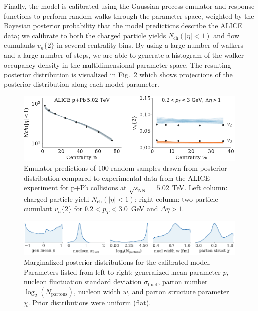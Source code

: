 \documentclass[3p,times,procedia]{elsarticle}
\begin{document}
Finally, the model is calibrated using the Gaussian process emulator and response functions to perform random walks through the parameter space, weighted by the Bayesian posterior probability that the model predictions describe the ALICE data; we calibrate to both the charged particle yields $N_\mathrm{ch}(|\eta| < 1)$ and flow cumulants $v_n\{2\}$ in several centrality bins.
By using a large number of walkers and a large number of steps, we are able to generate a histogram of the walker occupancy density in the multidimensional parameter space.
The resulting posterior distribution is visualized in Fig.~\ref{fig:posterior} which shows projections of the posterior distribution along each model parameter.

\begin{figure}
  \centering
  \includegraphics{observables_samples}
  \caption{
    \label{fig:observables} Emulator predictions of 100 random samples drawn from posterior distribution compared to experimental data from the ALICE experiment for p+Pb collisions at $\sqrt{s_\mathrm{NN}} = 5.02$~TeV.
    Left column: charged particle yield $N_\mathrm{ch}(|\eta| < 1)$; right column: two-particle cumulant $v_n\{2\}$ for $0.2 < p_T < 3.0$~GeV and $\Delta \eta > 1$.
  }
\end{figure}

\begin{figure}
  \includegraphics{posterior}
  \caption{
    \label{fig:posterior} Marginalized posterior distributions for the calibrated model.
    Parameters listed from left to right: generalized mean parameter $p$, nucleon fluctuation standard deviation $\sigma_\mathrm{fluct}$, parton number $\log_2(N_\mathrm{partons})$, nucleon width $w$, and parton structure parameter $\chi$.
    Prior distributions were uniform (flat).
  }
\end{figure}
\end{document}
